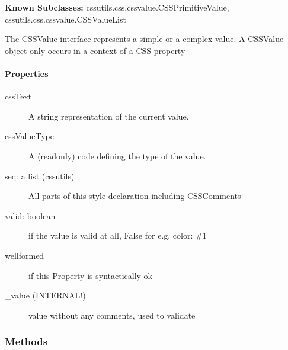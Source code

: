 \textbf{Known Subclasses:}
cssutils.css.cssvalue.CSSPrimitiveValue,
    cssutils.css.cssvalue.CSSValueList


The CSSValue interface represents a simple or a complex value.
A CSSValue object only occurs in a context of a CSS property



\hypertarget{properties}{}
\paragraph*{Properties}
\label{properties}
\begin{description}
\item[{cssText}] \leavevmode 
A string representation of the current value.

\item[{cssValueType}] \leavevmode 
A (readonly) code defining the type of the value.

\item[{seq: a list (cssutils)}] \leavevmode 
All parts of this style declaration including CSSComments

\item[{valid: boolean}] \leavevmode 
if the value is valid at all, False for e.g. color: {\#}1

\item[{wellformed}] \leavevmode 
if this Property is syntactically ok

\item[{{\_}value (INTERNAL!)}] \leavevmode 
value without any comments, used to validate

\end{description}


  \subsubsection{Methods}

    \vspace{0.5ex}

